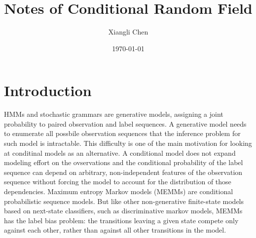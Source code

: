 \documentclass{amsart}
\theoremstyle{plain}
\theoremstyle{definition}
\theoremstyle{remark}
\numberwithin{equation}{section}
\begin{document}
\title[sub-title]
      {Notes of Conditional Random Field}
\author{Xiangli Chen}
\address{Computer Science Department\\
         University of Illinois at Chicago\\
         Chicago, IL 60607} 
\date{\today}
\maketitle
\section{Introduction}\label{sec:intro}
\noindent HMMs and stochastic grammars \cite{lafferty2001conditional} are generative models, 
assigning a joint probability to paired observation and label sequences. 
A generative model needs to enumerate all possbile observation sequences 
that the inference problem for such model is intractable. 
This difficulty is one of the main motivation for looking at conditinal models as an alternative.
A conditional model does not expand modeling effort on the ovservations 
and the conditional probability of the label sequence can depend on arbitrary, 
non-independent features of the observation sequence without forcing the model 
to account for the distribution of those dependencies. 
Maximum entropy Markov models (MEMMs) \cite{mccallum2000maximum} are conditional probabilistic sequence models. 
But like other non-generative finite-state models based on next-state classifiers, 
such as discriminative markov models, MEMMs has the label bias problem: 
the transitions leaving a given state compete only against each other, 
rather than against all other transitions in the model.
\end{document}
